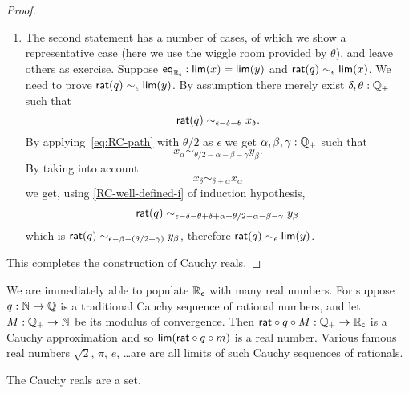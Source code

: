 \begin{proof}
\begin{enumerate}
\begin{itemize}
    \end{itemize}
  \item The second statement has a number of cases, of which we show a representative
    case (here we use the wiggle room provided by $\theta$), and leave others as exercise.
    Suppose $\mathsf{eq}_{\mathbb{R}_\mathsf{c}} : \mathsf{lim}(x) = \mathsf{lim}(y)$ and $\mathsf{rat}(q)
      \sim_\epsilon \mathsf{lim}(x)$. We need to prove $\mathsf{rat}(q) \sim_\epsilon \mathsf{lim}(y)$.
      By assumption there merely exist $\delta, \theta : \mathbb{Q}_{+}$ such that
      \begin{equation*}
        \mathsf{rat}(q) \sim_{\epsilon - \delta - \theta} x_\delta.
      \end{equation*}
      By applying~\eqref{eq:RC-path} with $\theta/2$ as $\epsilon$ we get $\alpha, \beta,
      \gamma : \mathbb{Q}_{+}$ such that
      \begin{equation*}
        x_\alpha \sim_{\theta/2 - \alpha - \beta - \gamma} y_\beta.
      \end{equation*}
      By taking into account
      \begin{equation*}
        x_\delta \sim_{\delta + \alpha} x_\alpha
      \end{equation*}
      we get, using \autoref{RC-well-defined-i} of induction hypothesis,
      \begin{equation*}
        \mathsf{rat}(q)
        \sim_{\epsilon - \delta - \theta + \delta + \alpha + \theta/2 - \alpha - \beta - \gamma}
        y_\beta
      \end{equation*}
      which is $\mathsf{rat}(q) \sim_{\epsilon - \beta - (\theta/2 + \gamma)} y_\beta$, therefore
      $\mathsf{rat}(q) \sim_\epsilon \mathsf{lim}(y)$.
  \end{enumerate}
  This completes the construction of Cauchy reals.
\end{proof}

We are immediately able to populate $\mathbb{R}_\mathsf{c}$ with many real numbers. For suppose $q : \mathbb{N} \to
\mathbb{Q}$ is a traditional Cauchy sequence of rational numbers, and let $M : \mathbb{Q}_{+} \to \mathbb{N}$ be its
modulus of convergence. Then $\mathsf{rat} \circ q \circ M : \mathbb{Q}_{+} \to \mathbb{R}_\mathsf{c}$ is a Cauchy
approximation and so $\mathsf{lim}(\mathsf{rat} \circ q \circ m)$ is a real number. Various famous
real numbers $\sqrt{2}$, $\pi$, $e$, \dots are are all limits of such Cauchy sequences of
rationals.

\begin{thm}
  The Cauchy reals are a set.
\end{thm}

